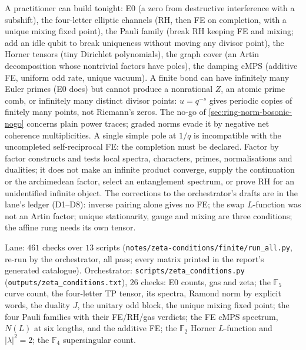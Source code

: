 \begin{observation}
\label{obs:factor-by-factor-limits}
A practitioner can build tonight: E0 (a zero from destructive interference with a subshift), the
four-letter elliptic channels (RH, then FE on completion, with a unique mixing fixed point), the
Pauli family (break RH keeping FE and mixing; add an idle qubit to break uniqueness without moving
any divisor point), the Horner tensors (tiny Dirichlet polynomials), the graph cover (an Artin
decomposition whose nontrivial factors have poles), the damping cMPS (additive FE, uniform odd
rate, unique vacuum). A finite bond can have infinitely many Euler primes (E0 does) but cannot
produce a nonrational $Z$, an atomic prime comb, or infinitely many distinct divisor points:
$u = q^{-s}$ gives periodic copies of finitely many points, not Riemann's zeros. The no-go of
\cref{sec:ring-norm-bosonic-nogo} concerns plain power traces; graded norms evade it by negative net
coherence multiplicities. A single simple pole at $1/q$ is incompatible with the uncompleted
self-reciprocal FE: the completion must be declared. Factor by factor constructs and tests local
spectra, characters, primes, normalisations and dualities; it does not make an infinite product
converge, supply the continuation or the archimedean factor, select an entanglement spectrum, or
prove RH for an unidentified infinite object. The corrections to the orchestrator's drafts are in
the lane's ledger (D1--D8): inverse pairing alone gives no FE; the swap $L$-function was not an
Artin factor; unique stationarity, gauge and mixing are three conditions; the affine rung needs its
own tensor.
\end{observation}

\begin{numerical}
\label{num:zeta-conditions}
Lane: $461$ checks over $13$ scripts (\texttt{notes/zeta-conditions/finite/run\_all.py}, re-run by the
orchestrator, all pass; every matrix printed in the report's generated catalogue). Orchestrator:
\texttt{scripts/zeta\_conditions.py} (\texttt{outputs/zeta\_conditions.txt}), $26$ checks: E0 counts, gas
and zeta; the $\mathbb F_5$ curve count, the four-letter TP tensor, its spectra, Ramond norm by explicit
words, the duality $J$, the unitary odd block, the unique mixing fixed point; the four Pauli
families with their FE/RH/gas verdicts; the FE cMPS spectrum, $N(L)$ at six lengths, and the
additive FE; the $\mathbb F_2$ Horner $L$-function and $|\lambda|^2 = 2$; the $\mathbb F_4$ supersingular count.
\end{numerical}
